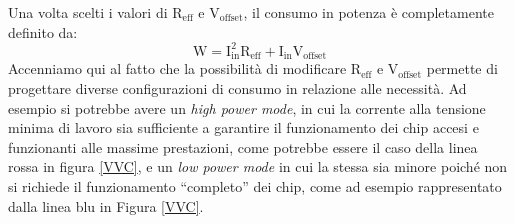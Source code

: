 
Una volta scelti i valori di $\mathrm{R_{eff}}$ e $\mathrm{V_{offset}}$, il consumo in potenza è completamente definito da:
\begin{equation}
\mathrm{W=I_{in}^2R_{eff}+I_{in}V_{offset}}
\end{equation}
Accenniamo qui al fatto che la possibilità di modificare $\mathrm{R_{eff}}$ e $\mathrm{V_{offset}}$ permette di progettare diverse configurazioni di consumo in relazione alle necessità.
Ad esempio si potrebbe avere un \textit{high power mode}, in cui la corrente alla tensione minima di lavoro sia sufficiente a garantire il funzionamento dei chip accesi e funzionanti alle massime prestazioni, come potrebbe essere il caso della linea rossa in figura \ref{VVC}, e un \textit{low power mode} in cui la stessa sia minore poiché non si richiede il funzionamento ``completo'' dei chip, come ad esempio rappresentato dalla linea blu in Figura \ref{VVC}.

